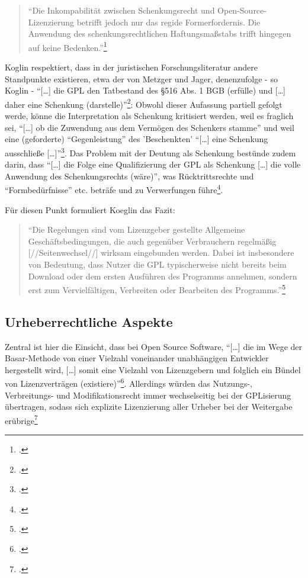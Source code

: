 \documentclass[DIV=calc,BCOR=5mm,11pt,headings=small,oneside,abstract=true, toc=bib]{scrartcl}
\begin{document}
\begin{quote}\enquote{Die Inkompabilität zwischen Schenkungsrecht und
Open-Source-Lizenzierung betrifft jedoch nur das regide Formerfordernis.
Die Anwendung des schenkungsrechtlichen Haftungsmaßstabs trifft hingegen
auf keine Bedenken.}\footcite[][62 - Typo(?) im Original, gemeint ist
wahrscheinlich die Inkompatibilität]{Koglin2007a}
\end{quote}

Koglin respektiert, dass in der juristischen Forschungsliteratur andere
Standpunkte existieren, etwa der von Metzger und Jager, denenzufolge - so Koglin
- \enquote{[\ldots] die GPL den Tatbestand des §516 Abs. 1 BGB (erfülle)
und [\ldots] daher eine Schenkung
(darstelle)}\footcite[vgl.][38]{Koglin2007a}: Obwohl dieser Aufassung
partiell gefolgt werde, könne die Interpretation als Schenkung kritisiert
werden, weil es fraglich sei, \enquote{[\ldots] ob die Zuwendung aus dem
Vermögen des Schenkers stamme} und weil eine (geforderte)
\enquote{Gegenleistung} des 'Beschenkten' \enquote{[\ldots] eine
Schenkung ausschließe [\ldots]}\footcite[vgl.][39]{Koglin2007a}. Das
Problem mit der Deutung als Schenkung bestünde zudem darin, dass \enquote{[\ldots]
die Folge eine Qualifizierung der GPL als Schenkung [\ldots] die volle
Anwendung des Schenkungsrechts (wäre)}, was Rücktrittsrechte und
\enquote{Formbedürfnisse} etc. beträfe und zu Verwerfungen
führe\footcite[vgl.][52ff]{Koglin2007a}.

Für diesen Punkt formuliert Koeglin das Fazit:

\begin{quote}\enquote{Die Regelungen sind vom Lizenzgeber gestellte Allgemeine
Geschäftsbedingungen, die auch gegenüber Verbrauchern regelmäßig
[//Seitenwechsel//] wirksam eingebunden werden. Dabei ist insbesondere von
Bedeutung, dass Nutzer die GPL typischerweise nicht bereits beim Download oder
dem ersten Ausführen des Programms annehmen, sondern erst zum Vervielfältigen,
Verbreiten oder Bearbeiten des
Programms.}\footcite[vgl.][228]{Koglin2007a}
\end{quote}

\subsection{Urheberrechtliche Aspekte}

Zentral ist hier die Einsicht, dass bei Open Source Software, \enquote{[\ldots]
die im Wege der Basar-Methode von einer Vielzahl voneinander unabhängigen
Entwickler hergestellt wird, [\ldots] somit eine Vielzahl von
Lizenzgebern und folglich ein Bündel von Lizenzverträgen
(existiere)}\footcite[vgl.][225]{Koglin2007a}. Allerdings würden das
Nutzungs-, Verbreitungs- und Modifikationsrecht immer wechselseitig bei der
GPLisierung übertragen, sodass sich explizite Lizenzierung aller Urheber bei der
Weitergabe erübrige\footcite[vgl.][133]{Koglin2007a}
\end{document}
